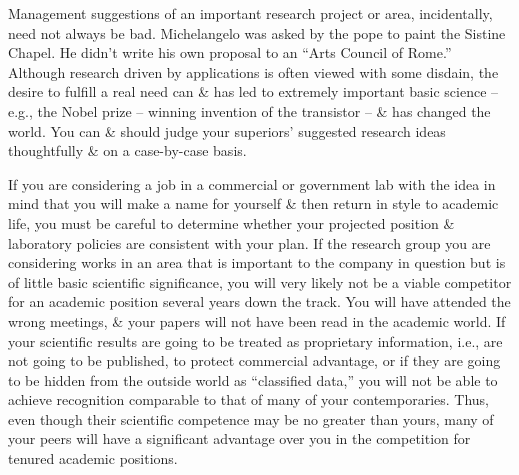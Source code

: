 \documentclass{article}
\begin{document}
\begin{enumerate}
\begin{itemize}
\begin{itemize}
			Management suggestions of an important research project or area, incidentally, need not always be bad. Michelangelo was asked by the pope to paint the Sistine Chapel. He didn't write his own proposal to an ``Arts Council of Rome.'' Although research driven by applications is often viewed with some disdain, the desire to fulfill a real need can \& has led to extremely important basic science -- e.g., the Nobel prize -- winning invention of the transistor -- \& has changed the world. You can \& should judge your superiors' suggested research ideas thoughtfully \& on a case-by-case basis.
			
			If you are considering a job in a commercial or government lab with the idea in mind that you will make a name for yourself \& then return in style to academic life, you must be careful to determine whether your projected position \& laboratory policies are consistent with your plan. If the research group you are considering works in an area that is important to the company in question but is of little basic scientific significance, you will very likely not be a viable competitor for an academic position several years down the track. You will have attended the wrong meetings, \& your papers will not have been read in the academic world. If your scientific results are going to be treated as proprietary information, i.e., are not going to be published, to protect commercial advantage, or if they are going to be hidden from the outside world as ``classified data,'' you will not be able to achieve recognition comparable to that of many of your contemporaries. Thus, even though their scientific competence may be no greater than yours, many of your peers will have a significant advantage over you in the competition for tenured academic positions.
			

\end{itemize}
\end{itemize}
\end{enumerate}
\end{document}
